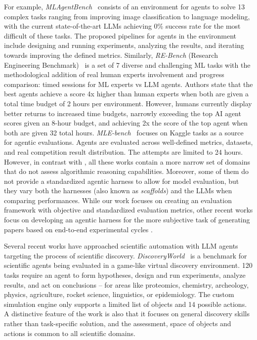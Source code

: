 For example, \textit{MLAgentBench}~\citep{huangMLAgentBenchEvaluatingLanguage2024} consists of an environment for agents to solve 13 complex tasks ranging from improving image classification to language modeling, with the current state-of-the-art LLMs achieving 0\% success rate for the most difficult of these tasks. The proposed pipelines for agents in the environment include designing and running experiments, analyzing the results, and iterating towards improving the defined metrics. Similarly, \textit{RE-Bench} (Research Engineering Benchmark)~\citep{rebench-metr} is a set of 7 diverse and challenging ML tasks with the methodological addition of real human experts involvement and progress comparison: timed sessions for ML experts vs LLM agents. Authors state that the best agents achieve a score 4x higher than human experts when both are given a total time budget of 2 hours per environment. However, humans currently display better returns to increased time budgets, narrowly exceeding the top AI agent scores given an 8-hour budget, and achieving 2x the score of the top agent when both are given 32 total hours. \textit{MLE-bench}~\citep{chanMLEbenchEvaluatingMachine2024} focuses on Kaggle tasks as a source for agentic evaluations. Agents are evaluated across well-defined metrics, datasets, and real competition result distribution. The attempts are limited to 24 hours. However, in contrast with \textsc{\mlgym}, all these works contain a more narrow set of domains that do not assess algorithmic reasoning capabilities. Moreover, some of them do not provide a standardized agentic harness to allow for model evaluation, but they vary both the harnesses (also known as \textit{scaffolds}) and the LLMs when comparing performances. While our work focuses on creating an evaluation framework with objective and standardized evaluation metrics, other recent works focus on developing an agentic harness for the more subjective task of generating papers based on end-to-end experimental cycles \citep{luAIScientistFully2024}. 



Several recent works have approached scientific automation with LLM agents targeting the process of scientific discovery. \textit{DiscoveryWorld}~\citep{jansenDISCOVERYWORLDVirtualEnvironment2024} is a benchmark for scientific agents being evaluated in a game-like virtual discovery environment. 120 tasks require an agent to form hypotheses, design and run experiments, analyze results, and act on conclusions -- for areas like proteomics, chemistry, archeology, physics, agriculture, rocket science, linguistics, or epidemiology. The custom simulation engine only supports a limited list of objects and 14 possible actions.
A distinctive feature of the work is also that it focuses on general discovery skills rather than task-specific solution, and the assessment, space of objects and actions is common to all scientific domains.

